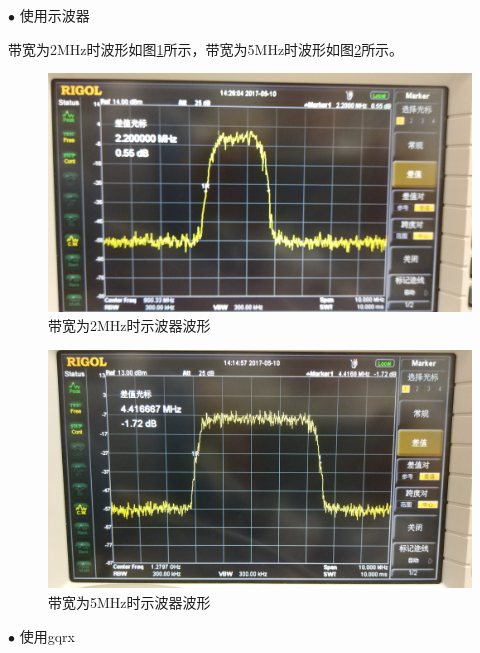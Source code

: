 		\par $\bullet$ 使用示波器
		\par 带宽为2MHz时波形如图\ref{fig:dvbt_BW_2MHz}所示，带宽为5MHz时波形如图\ref{fig:dvbt_BW_5MHz}所示。
		\begin{figure}[htp]
			\centering
			\includegraphics[width=13cm]{figures/dvbt_BW_2MHz.jpg}
			\caption{带宽为2MHz时示波器波形}
			\label{fig:dvbt_BW_2MHz}
		\end{figure}
		\begin{figure}[htp]
			\centering
			\includegraphics[width=13cm]{figures/dvbt_BW_5MHz.jpg}
			\caption{带宽为5MHz时示波器波形}
			\label{fig:dvbt_BW_5MHz}
		\end{figure}
		\par $\bullet$ 使用gqrx
